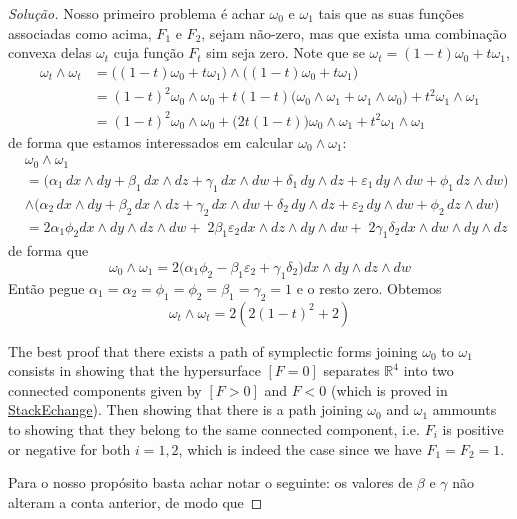 \begin{proof}[Solução]
	Nosso primeiro problema é achar $\omega_0$ e $\omega_1$ tais que as suas funções associadas como acima, $F_1$ e $F_2$, sejam não-zero, mas que exista uma combinação convexa delas $\omega_t$ cuja função $F_t$ sim seja zero. Note que se $\omega_t=(1-t)\omega_0+t\omega_1$,
\begin{align*}
	\omega_t\wedge \omega_t&=\Big( (1-t)\omega_0+t\omega_1 \Big) \wedge \Big( (1-t)\omega_0+t \omega_1 \Big) \\
	&=(1-t)^2\omega_0\wedge \omega_0+t(1-t)\Big(\omega_0\wedge \omega_1+\omega_1\wedge \omega_0\Big)+t^2\omega_1\wedge \omega_1\\
	&=(1-t)^2\omega_0\wedge \omega_0+\Big(2t(1-t)\Big)\omega_0\wedge \omega_1+t^2\omega_1\wedge \omega_1\
\end{align*}
de forma que estamos interessados em calcular $\omega_0\wedge \omega_1$:
\begin{align*}
	&\omega_0\wedge \omega_1\\
	&=\Big( \alpha_1 \, dx \wedge dy + \beta_1 \, dx \wedge dz + \gamma_1 \, dx \wedge dw + \delta_1 \, dy \wedge dz + \varepsilon_1 \, dy \wedge dw + \phi_1 \, dz \wedge dw \Big)\\
	&\wedge \Big( \alpha_2 \, dx \wedge dy + \beta_2 \, dx \wedge dz + \gamma_2 \, dx \wedge dw + \delta_2 \, dy \wedge dz + \varepsilon_2 \, dy \wedge dw + \phi_2 \, dz \wedge dw \Big) \\
	&= 2\alpha_1 \phi_2dx\wedge dy\wedge dz\wedge dw+\;2\beta_1\varepsilon_2 dx\wedge dz\wedge dy\wedge dw+\; 2\gamma_1\delta_2dx\wedge dw \wedge dy\wedge dz
\end{align*}
de forma que
\[\omega_0\wedge \omega_1=2\Big(\alpha_1\phi_2-\beta_1 \varepsilon_2+\gamma_1 \delta_2\Big)dx\wedge dy\wedge dz\wedge dw\]
Então pegue $\alpha_1=\alpha_2=\phi_1=\phi_2=\beta_1=\gamma_2=1$ e o resto zero. Obtemos
\[\omega_t\wedge \omega_t=2\left( 2(1-t)^2+2 \right)  \]

The best proof that there exists a path of symplectic forms joining $\omega_0$ to $\omega_1$ consists in showing that the hypersurface $[F=0]$ separates $\mathbb{R}^{4}$ into two connected components given by $[F>0]$ and  $F<0$ (which is proved in \href{https://math.stackexchange.com/questions/2864834/non-linear-path-between-symplectic-forms-in-mathbbr4}{StackEchange}). Then showing that there is a path joining  $\omega_0$ and $\omega_1$ ammounts to showing that they belong to the same connected component, i.e. $F_i$ is positive or negative for both $i=1,2$, which is indeed the case since we have $F_1=F_2=1$.

Para o nosso propósito basta achar notar o seguinte: os valores de $\beta$ e $\gamma$ não alteram a conta anterior, de modo que 

\end{proof}

